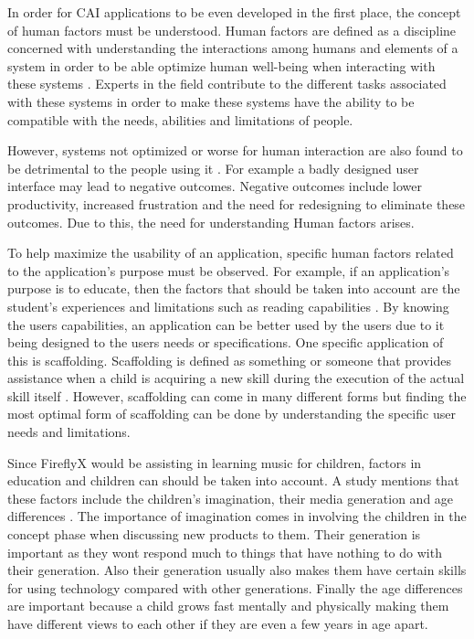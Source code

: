 In order for CAI applications to be even developed in the first place, the concept of human factors must be understood. Human factors are defined as a discipline concerned with understanding the interactions among humans and elements of a system in order to be able optimize human well-being when interacting with these systems \cite{salvendy2012handbook}. Experts in the field contribute to the different tasks associated with these systems in order to make these systems have the ability to be compatible with the needs, abilities and limitations of people. 

However, systems not optimized or worse for human interaction are also found to be detrimental to the people using it \cite{foley1984human}. For example a badly designed user interface may lead to negative outcomes. Negative outcomes include lower productivity, increased frustration and the need for redesigning to eliminate these outcomes. Due to this, the need for understanding Human factors arises.

To help maximize the usability of an application, specific human factors related to the application's purpose must be observed. For example, if an application's purpose is to educate, then the factors that should be taken into account are the student's experiences and limitations such as reading capabilities \cite{radu2014augmented}. By knowing the users capabilities, an application can be better used by the users due to it being designed to the users needs or specifications. One specific application of this is scaffolding. Scaffolding is defined as something or someone that provides assistance when a child is acquiring a new skill during the execution of the actual skill itself \cite{strommen1998interface}. However, scaffolding can come in many different forms but finding the most optimal form of scaffolding can be done by understanding the specific user needs and limitations.

Since FireflyX would be assisting in learning music for children, factors in education and children can should be taken into account. A study mentions that these factors include the children's imagination, their media generation and age differences \cite{oosterholt1996interaction}. The importance of imagination comes in involving the children in the concept phase when discussing new products to them. Their generation is important as they wont respond much to things that have nothing to do with their generation. Also their generation usually also makes them have certain skills for using technology compared with other generations. Finally the age differences are important because a child grows fast mentally and physically making them have different views to each other if they are even a few years in age apart.


